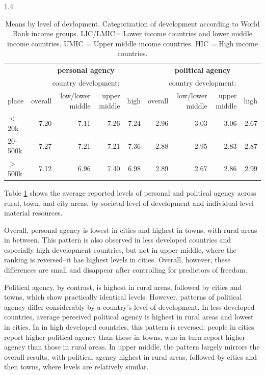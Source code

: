 \documentclass[10pt, letterpaper]{article}
\begin{document}
\begin{spacing}{1.4}
\begin{table}[H]\centering\footnotesize
\caption{\label{m0} Means by level of devlopment. Categorization of development
  according to World Bank income groups. LIC/LMIC= Lower income countries and
  lower middle income countries. UMIC = Upper middle income countries. HIC =
  High income countries.}
\begin{tabular} {lrrrr|rrrr}   \hline 
       & \multicolumn{4}{c|}{\bf personal agency}          &\multicolumn{4}{c}{\bf political agency}\\
       & \multicolumn{4}{c}{country development:}          &\multicolumn{4}{c}{country development:}\\ 
place  &overall&low/lower middle&upper middle&high&overall&low/lower middle&upper middle&high\\ \hline
$<$20k &7.20   &7.11            &7.26        &7.24&2.96   &3.03            &3.06        &2.67\\
20-500k&7.27   &7.21            &7.21        &7.36&2.88   &2.95            &2.83        &2.87\\
$>$500k&7.12   &6.96            &7.40        &6.98&2.89   &2.67            &2.86        &2.99\\ \hline
\end{tabular}\end{table}


Table \ref{m0} shows the average reported levels of personal and political
agency across rural, town, and city areas, by societal level of development and
individual-level material resources.

Overall, personal agency is lowest in cities and highest in
towns, with rural areas in between. This pattern is also observed in less developed countries
and especially high development countries, but not in upper middle,
where the ranking is reversed--it has highest levels in
cities. Overall, however, these differences are small and disappear after
controlling for predictors of freedom.

Political agency, by
contrast, is highest in rural areas, followed by cities and towns, which show
practically identical levels. However, patterns of political agency differ
considerably by a country's level of development. In  less developed countries, average
perceived political agency is highest in rural areas and lowest in cities. In
 in high developed countries, this pattern is reversed: people in cities report higher political
agency than those in towns, who in turn report higher agency than those in
rural areas. In upper middle, the pattern largely mirrors the overall results, with
political agency highest in rural areas, followed by cities and then towns,
where levels are relatively similar.



\end{spacing}
\end{document}
